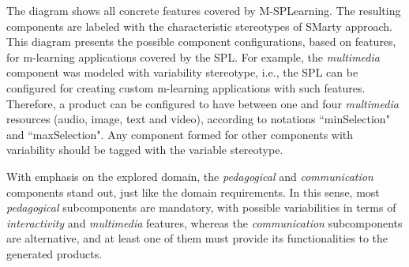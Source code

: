 The diagram shows all concrete features covered by M-SPLear\allowbreak ning. The resulting components are labeled with the characteristic stereotypes of SMarty approach. This diagram presents the possible component configurations, based on features, for m-learning applications covered by the SPL.
For example, the \textit{multimedia} component was modeled with variability stereotype, i.e., the SPL can be configured for creating custom m-learning applications with such features. Therefore, a product can be configured to have between one and four \textit{multimedia} resources (audio, image, text and video), according to notations ``minSelection" and ``maxSelection". Any component formed for other components with variability should be tagged with the variable stereotype.


With emphasis on the explored domain, the \textit{pedagogical} and \textit{communication} components stand out, just like the domain requirements. In this sense, most \textit{pedagogical} subcomponents are mandatory, with possible variabilities in terms of \textit{interactivity} and \textit{multimedia} features, whereas the \textit{communication} subcomponents are alternative, and at least one of them must provide its functionalities to the generated products.

